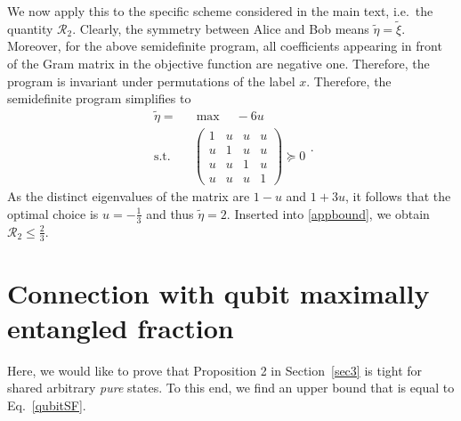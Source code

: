 \documentclass[aps,superscriptaddress,twocolumn,twoside,floatfix,pra,nofootinbib,a4paper]{revtex4-2}
\begin{document}
We now apply this to the specific scheme considered in the main text, i.e.~the quantity $\mathcal{R}_2$. Clearly, the symmetry between Alice and Bob means $\tilde{\eta}=\tilde{\xi}$. Moreover, for the above semidefinite program, all coefficients appearing in front of the Gram matrix in the objective function are negative one. Therefore, the program is invariant under permutations of the label $x$. Therefore, the semidefinite program simplifies to  
\begin{equation}\label{eq:alpha_tilde}
\begin{aligned}
\tilde{\eta}=&\max \quad -6u   \\
\textrm{s.t.}\quad &\begin{pmatrix}
1 & u & u&u \\
u & 1 & u &u\\
u&u&1 &u\\
u&u&u&1
\end{pmatrix}\succeq 0
\end{aligned}.
\end{equation}
As the distinct eigenvalues of the matrix are $1-u$ and $1+3u$, it follows that the optimal choice is $u=-\frac{1}{3}$ and thus $\tilde{\eta}=2$. Inserted into \eqref{appbound}, we obtain  $\mathcal{R}_2\leq\frac{2}{3}$. 



\section{Connection with qubit maximally entangled fraction}\label{App:SFqubit}

Here, 
we would like to prove that Proposition 2 in Section~\ref{sec3} is tight for shared arbitrary \textit{pure} states. To this end, we find an upper bound that is equal to Eq.~\eqref{qubitSF}.
\end{document}
